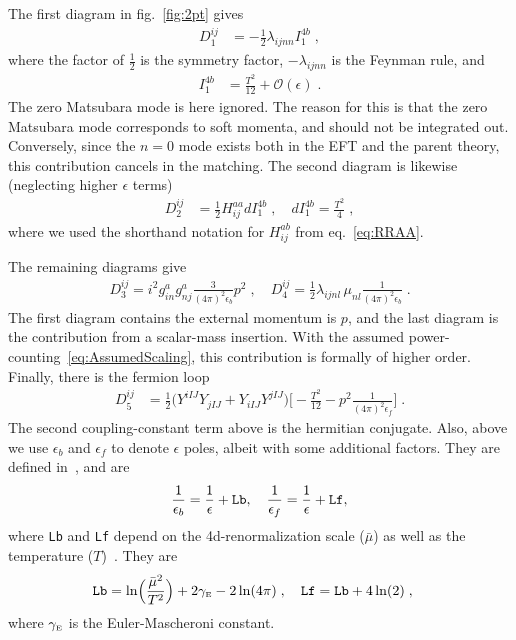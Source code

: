 \documentclass[11pt]{article}
\newcommand{\gammaE}{{\gamma_\rmii{E}}}
\newcommand{\LamD}{\bmu}
\newcommand{\bmu}{\bar\mu}
\newcommand{\rmii}[1]{{\mbox{\tiny\rm{#1}}}}
\begin{document}
The first diagram in fig.~\ref{fig:2pt} gives
\begin{align}
  D_1^{ij} &=-\frac{1}{2}\lambda_{i j n n} I^{4b}_{1}
  \;, 
\end{align}
where the factor of $\frac{1}{2}$ is the symmetry factor,
$-\lambda_{ijnn}$ is the Feynman rule, and 
\begin{align}
  I^{4b}_{1} &=
      \frac{T^2}{12} 
    + \mathcal{O}(\epsilon)
  \;.
\end{align}
The zero Matsubara mode is here ignored.
The reason for this is that the zero Matsubara mode corresponds to soft momenta, and should not be integrated out.
Conversely,
since the $n=0$ mode exists both in
the EFT and the parent theory, this contribution cancels in the matching.
The second diagram is likewise (neglecting higher $\epsilon$ terms)
\begin{align}
  D_2^{ij} &= \frac{1}{2}H^{aa}_{ij} dI_1^{4b}
  \;,\quad
dI_1^{4b} = \frac{T^2}{4}
  \;,
\end{align}
where we used the shorthand notation for
$H^{a b}_{i j}$ from eq.~\eqref{eq:RRAA}.

The remaining diagrams give
\begin{align}
  D_3^{ij} =
  i^2 g^a_{i n}g^a_{n j} \frac{3}{(4\pi)^2 \epsilon_b}p^2
  \;, \quad
  D_4^{ij} =
  \frac{1}{2}\lambda_{i j n l}^{ }\, \mu_{n l}^{ } \frac{1}{(4\pi)^2\epsilon_b}
  \;.
\end{align}
The first diagram contains the external momentum is $p$, and
the last diagram is the contribution from a scalar-mass insertion.
With the assumed power-counting~\eqref{eq:AssumedScaling},
this contribution is formally of higher order.
Finally,
there is the fermion loop
\begin{align}
  D_5^{ij} &= \frac{1}{2}\bigl(
    Y^{i I J}Y_{j I J}
  + Y_{i I J}Y^{j I J}\bigr)
  \biggl[ -\frac{T^2}{12}-p^2\frac{1}{(4\pi)^2\epsilon_f}\biggr]
  \;.
\end{align}
The second coupling-constant term above is the hermitian conjugate.
%
Also, above we use
$\epsilon_b$ and $\epsilon_f$ to denote $\epsilon$ poles, albeit with some additional factors.
They are defined
in~\cite{Kajantie:1995dw,Farakos:1994kx}, and are
\begin{align}
\frac{1}{\epsilon_b}=\frac{1}{\epsilon}+\text{\tt Lb},\quad  \frac{1}{\epsilon_f}=\frac{1}{\epsilon}+\text{\tt Lf},
\end{align}
where
{\tt Lb} and
{\tt Lf}
depend on
the 4d-renormalization scale ($\LamD$)
as well as
the temperature ($T$)~\cite{Kajantie:1995dw,Farakos:1994kx}.
They are
\begin{align}
\label{eq:lblf}
{\tt Lb} &= \ln\Bigl(\frac{\bmu^2}{T^2}\Bigr)
+ 2\gammaE
- 2\ln(4\pi)
\;,\quad
{\tt Lf} = {\tt Lb} + 4\ln(2)
\;,
\end{align}
where
$\gammaE$ is the Euler-Mascheroni constant.
\end{document}
